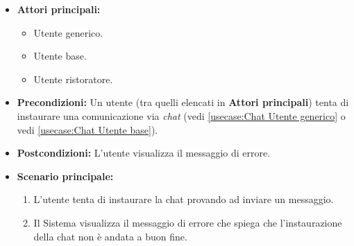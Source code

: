 \label{usecase:Errore instaurazione chat}
\begin{itemize}
    \item \textbf{Attori principali:} 
	\begin{itemize}
        \item Utente generico.
        \item Utente base.
        \item Utente ristoratore.
    \end{itemize}

	\item \textbf{Precondizioni:}
	      Un utente (tra quelli elencati in \textbf{Attori principali}) tenta di instaurare una comunicazione via \textit{chat} (vedi \autoref{usecase:Chat Utente generico} o vedi \autoref{usecase:Chat Utente base}).

	\item \textbf{Postcondizioni:}
	      L'utente visualizza il messaggio di errore.

	\item \textbf{Scenario principale:}
	      \begin{enumerate}
		      \item L'utente tenta di instaurare la chat provando ad inviare un messaggio.
		      \item Il Sistema visualizza il messaggio di errore che spiega che l'instaurazione della chat non è andata a buon fine.
	      \end{enumerate}
\end{itemize}